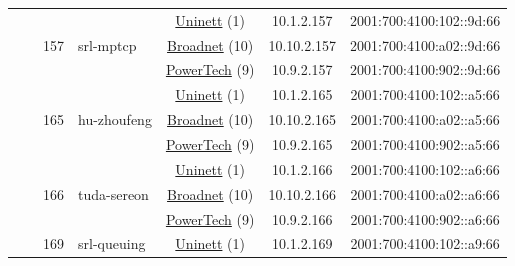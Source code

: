 \begin{small}
\begin{center}
\begin{longtable}{|c|c|c|c|c|c|c|c|}
  &  & \multirow{3}{*}{\tiny{157}} & \multicolumn{1}{|l|}{\multirow{3}{*}{\tiny{srl-mptcp}}} & \multicolumn{2}{|c|}{\tiny{\href{https://www.uninett.no}{Uninett} (1)}} & \tiny{10.1.2.157} & \tiny{2001:700:4100:102::9d:66} \\* \cline{5-5}\cline{6-6}\cline{7-7}\cline{8-8}
  &  &  &  & \multicolumn{2}{|c|}{\tiny{\href{https://www.broadnet.no}{Broadnet} (10)}} & \tiny{10.10.2.157} & \tiny{2001:700:4100:a02::9d:66} \\* \cline{5-5}\cline{6-6}\cline{7-7}\cline{8-8}
  &  &  &  & \multicolumn{2}{|c|}{\tiny{\href{http://www.powertech.no}{PowerTech} (9)}} & \tiny{10.9.2.157} & \tiny{2001:700:4100:902::9d:66} \\* \cline{3-3}\cline{4-4}\cline{5-5}\cline{6-6}\cline{7-7}\cline{8-8}
  &  & \multirow{3}{*}{\tiny{165}} & \multicolumn{1}{|l|}{\multirow{3}{*}{\tiny{hu-zhoufeng}}} & \multicolumn{2}{|c|}{\tiny{\href{https://www.uninett.no}{Uninett} (1)}} & \tiny{10.1.2.165} & \tiny{2001:700:4100:102::a5:66} \\* \cline{5-5}\cline{6-6}\cline{7-7}\cline{8-8}
  &  &  &  & \multicolumn{2}{|c|}{\tiny{\href{https://www.broadnet.no}{Broadnet} (10)}} & \tiny{10.10.2.165} & \tiny{2001:700:4100:a02::a5:66} \\* \cline{5-5}\cline{6-6}\cline{7-7}\cline{8-8}
  &  &  &  & \multicolumn{2}{|c|}{\tiny{\href{http://www.powertech.no}{PowerTech} (9)}} & \tiny{10.9.2.165} & \tiny{2001:700:4100:902::a5:66} \\* \cline{3-3}\cline{4-4}\cline{5-5}\cline{6-6}\cline{7-7}\cline{8-8}
  &  & \multirow{3}{*}{\tiny{166}} & \multicolumn{1}{|l|}{\multirow{3}{*}{\tiny{tuda-sereon}}} & \multicolumn{2}{|c|}{\tiny{\href{https://www.uninett.no}{Uninett} (1)}} & \tiny{10.1.2.166} & \tiny{2001:700:4100:102::a6:66} \\* \cline{5-5}\cline{6-6}\cline{7-7}\cline{8-8}
  &  &  &  & \multicolumn{2}{|c|}{\tiny{\href{https://www.broadnet.no}{Broadnet} (10)}} & \tiny{10.10.2.166} & \tiny{2001:700:4100:a02::a6:66} \\* \cline{5-5}\cline{6-6}\cline{7-7}\cline{8-8}
  &  &  &  & \multicolumn{2}{|c|}{\tiny{\href{http://www.powertech.no}{PowerTech} (9)}} & \tiny{10.9.2.166} & \tiny{2001:700:4100:902::a6:66} \\* \cline{3-3}\cline{4-4}\cline{5-5}\cline{6-6}\cline{7-7}\cline{8-8}
  &  & \multirow{3}{*}{\tiny{169}} & \multicolumn{1}{|l|}{\multirow{3}{*}{\tiny{srl-queuing}}} & \multicolumn{2}{|c|}{\tiny{\href{https://www.uninett.no}{Uninett} (1)}} & \tiny{10.1.2.169} & \tiny{2001:700:4100:102::a9:66} \\* \cline{5-5}\cline{6-6}\cline{7-7}\cline{8-8}

\end{longtable}
\end{center}
\end{small}
